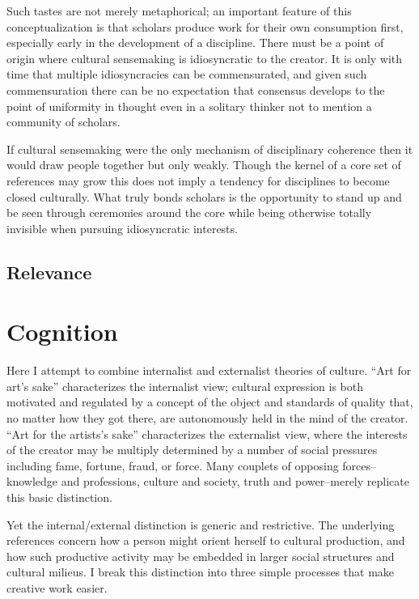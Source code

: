 \documentclass[]{article}
\begin{document}
Such tastes are not merely metaphorical; an important feature of this
conceptualization is that scholars produce work for their own
consumption first, especially early in the development of a discipline.
There must be a point of origin where cultural sensemaking is
idiosyncratic to the creator. It is only with time that multiple
idiosyncracies can be commensurated, and given such commensuration there
can be no expectation that consensus develops to the point of uniformity
in thought even in a solitary thinker not to mention a community of
scholars.

If cultural sensemaking were the only mechanism of disciplinary
coherence then it would draw people together but only weakly. Though the
kernel of a core set of references may grow this does not imply a
tendency for disciplines to become closed culturally. What truly bonds
scholars is the opportunity to stand up and be seen through ceremonies
around the core while being otherwise totally invisible when pursuing
idiosyncratic interests.

\subsection{Relevance}\label{relevance}

\section{Cognition}\label{cognition}

Here I attempt to combine internalist and externalist theories of
culture. ``Art for art's sake'' characterizes the internalist view;
cultural expression is both motivated and regulated by a concept of the
object and standards of quality that, no matter how they got there, are
autonomously held in the mind of the creator. ``Art for the artists's
sake'' characterizes the externalist view, where the interests of the
creator may be multiply determined by a number of social pressures
including fame, fortune, fraud, or force. Many couplets of opposing
forces--knowledge and professions, culture and society, truth and
power--merely replicate this basic distinction.

Yet the internal/external distinction is generic and restrictive. The
underlying references concern how a person might orient herself to
cultural production, and how such productive activity may be embedded in
larger social structures and cultural milieus. I break this distinction
into three simple processes that make creative work easier.
\end{document}
